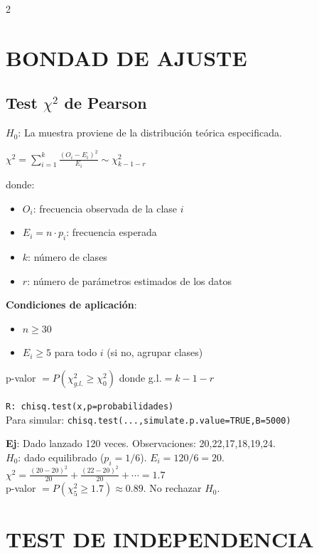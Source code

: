 \documentclass[9pt,a4paper]{article}
\newcommand{\R}{\texttt{R: }}
\begin{document}
\begin{multicols}{2}
\section{BONDAD DE AJUSTE}

\subsection{Test $\chi^2$ de Pearson}
$H_0$: La muestra proviene de la distribución teórica especificada.

\begin{formulabox}
$\chi^2=\sum_{i=1}^{k}\frac{(O_i-E_i)^2}{E_i}\sim\chi^2_{k-1-r}$
\end{formulabox}
donde:
\begin{itemize}[leftmargin=*]
\item $O_i$: frecuencia observada de la clase $i$
\item $E_i=n\cdot p_i$: frecuencia esperada
\item $k$: número de clases
\item $r$: número de parámetros estimados de los datos
\end{itemize}

\textbf{Condiciones de aplicación}:
\begin{itemize}[leftmargin=*]
\item $n\geq 30$
\item $E_i\geq 5$ para todo $i$ (si no, agrupar clases)
\end{itemize}

p-valor $=P(\chi^2_{g.l.}\geq\chi^2_0)$ donde g.l.$=k-1-r$

\R\texttt{chisq.test(x,p=probabilidades)}\\
Para simular: \texttt{chisq.test(...,simulate.p.value=TRUE,B=5000)}

\begin{exbox}
\textbf{Ej}: Dado lanzado 120 veces. Observaciones: 20,22,17,18,19,24.\\
$H_0$: dado equilibrado ($p_i=1/6$). $E_i=120/6=20$.\\
$\chi^2=\frac{(20-20)^2}{20}+\frac{(22-20)^2}{20}+\cdots=1.7$\\
p-valor $=P(\chi^2_5\geq 1.7)\approx 0.89$. No rechazar $H_0$.
\end{exbox}

\section{TEST DE INDEPENDENCIA}


\end{multicols}
\end{document}
